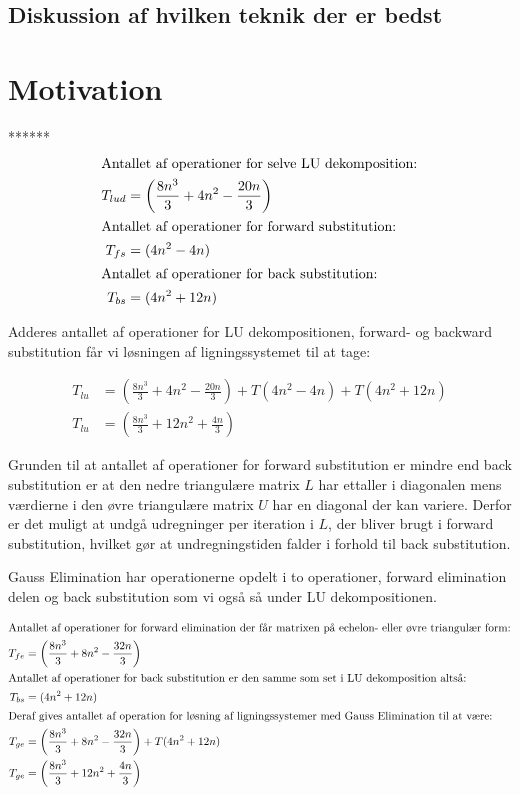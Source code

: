 \documentclass{article}
\begin{document}
\subsection{Diskussion af hvilken teknik der er bedst}


\section{Motivation}

******
\begin{align*}
\intertext{Antallet af operationer for selve LU dekomposition:}
T_{lud} &= \left(\frac{8n^3}{3} + 4n^2 - \frac{20n}{3}\right)\\
\intertext{Antallet af operationer for forward substitution:}
T_{fs} &= (4n^2-4n)\\
\intertext{Antallet af operationer for back substitution:}
T_{bs} &= (4n^2 + 12n)\\
\end{align*}

Adderes antallet af operationer for LU dekompositionen, forward- og backward substitution får vi løsningen af ligningssystemet til at tage:

\begin{align*}
T_{lu} &= \left(\frac{8n^3}{3} + 4n^2 - \frac{20n}{3}\right) + T(4n^2-4n)+T(4n^2+12n)\\
T_{lu} &= \left(\frac{8n^3}{3} + 12n^2 + \frac{4n}{3}\right)
\end{align*}

Grunden til at antallet af operationer for forward substitution er mindre end back substitution er at den nedre triangulære matrix $L$ har ettaller i diagonalen mens værdierne i den øvre triangulære matrix $U$ har en diagonal der kan variere. Derfor er det muligt at undgå udregninger per iteration i $L$, der bliver brugt i forward substitution, hvilket gør at undregningstiden falder i forhold til back substitution.\vspace{\baselineskip}

Gauss Elimination har operationerne opdelt i to operationer, forward elimination delen og back substitution som vi også så under LU dekompositionen. 

\begin{align*}
\intertext{Antallet af operationer for forward elimination der får matrixen på echelon- eller øvre triangulær form:}
T_{fe} &= \left(\frac{8n^3}{3} + 8n^2 - \frac{32n}{3}\right)\\
\intertext{Antallet af operationer for back substitution er den samme som set i LU dekomposition altså:}
T_{bs} &= (4n^2+12n)\\
\intertext{Deraf gives antallet af operation for løsning af ligningssystemer med Gauss Elimination til at være:}
T_{ge} &= \left(\frac{8n^3}{3} + 8n^2 - \frac{32n}{3}\right) + T(4n^2 + 12n)\\
T_{ge} &= \left(\frac{8n^3}{3} + 12n^2 + \frac{4n}{3}\right)
\end{align*}
\end{document}
